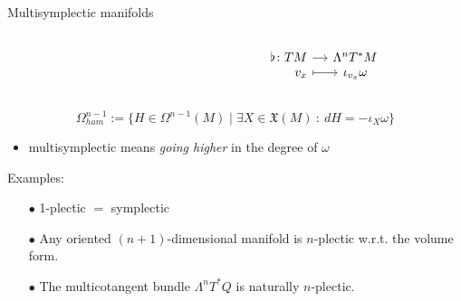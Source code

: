 \documentclass[handout,10pt]{beamer}
\begin{document}
\begin{frame}[fragile]{Multisymplectic manifolds} %
	\begin{defblock}
		
	\end{defblock}
	\begin{defblock}
		\begin{columns}
			\hfill
			\begin{column}{.5\linewidth}
			\end{column}
			\begin{column}{.5\linewidth}
				\[
				\begin{tikzcd}[column sep= small,row sep=0ex,
				/tikz/column 1/.append style={anchor=base east}]
				    \flat \colon T M \ar[r]& \Lambda^n T^\ast M \\
  						 v_x \ar[r, mapsto]& \iota_{v_x} \omega						
				\end{tikzcd}	
				\]
			\end{column}
		\end{columns}
	\end{defblock}
	\pause
	\begin{defblock}
		\begin{displaymath}
			\Omega^{n-1}_{ham} 	:=
			\biggr\{ H \in  \Omega^{n-1}(M) \; \biggr\vert \; 
				\exists X \in \mathfrak{X}(M) ~:~ d H = -\iota_X \omega \biggr\} 
			\end{displaymath}
	\end{defblock}
	\pause					
	\begin{itemize}
		\item multisymplectic means \emph{going higher} in the degree of $\omega$\pause
	\end{itemize}
	\vfill
	\begin{block}{Examples:}
		\begin{itemize}
			\item[$\bullet$] 1-plectic $=$ symplectic
			\item[$\bullet$] Any oriented $(n+1)$-dimensional manifold is $n$-plectic w.r.t. the volume form.
			\item[$\bullet$] The multicotangent bundle $\Lambda^n T^\ast Q$ is naturally $n$-plectic.
		\end{itemize}
	\end{block}			 
%
\end{frame}
\end{document}
